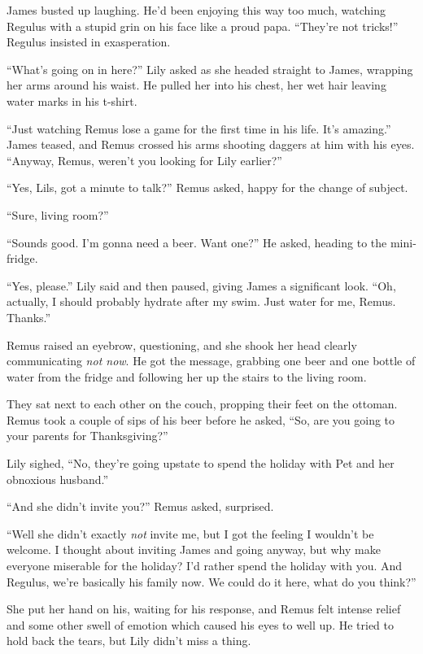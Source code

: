 \documentclass[12pt,twoside,openright]{memoir}
\begin{document}
James busted up laughing. He'd been enjoying this way too much, watching Regulus with a stupid grin on his face like a proud papa. ``They're not tricks!'' Regulus insisted in exasperation. 

``What's going on in here?'' Lily asked as she headed straight to James, wrapping her arms around his waist. He pulled her into his chest, her wet hair leaving water marks in his t-shirt. 

``Just watching Remus lose a game for the first time in his life. It's amazing.'' James teased, and Remus crossed his arms shooting daggers at him with his eyes. ``Anyway, Remus, weren't you looking for Lily earlier?'' 

``Yes, Lils, got a minute to talk?'' Remus asked, happy for the change of subject.

``Sure, living room?'' 

``Sounds good. I'm gonna need a beer. Want one?'' He asked, heading to the mini-fridge.

``Yes, please.'' Lily said and then paused, giving James a significant look. ``Oh, actually, I should probably hydrate after my swim. Just water for me, Remus. Thanks.''

Remus raised an eyebrow, questioning, and she shook her head clearly communicating \textit{not now}. He got the message, grabbing one beer and one bottle of water from the fridge and following her up the stairs to the living room.

They sat next to each other on the couch, propping their feet on the ottoman. Remus took a couple of sips of his beer before he asked, ``So, are you going to your parents for Thanksgiving?'' 

Lily sighed, ``No, they're going upstate to spend the holiday with Pet and her obnoxious husband.''

``And she didn't invite you?'' Remus asked, surprised. 

``Well she didn't exactly \textit{not} invite me, but I got the feeling I wouldn't be welcome. I thought about inviting James and going anyway, but why make everyone miserable for the holiday? I'd rather spend the holiday with you. And Regulus, we're basically his family now. We could do it here, what do you think?''

She put her hand on his, waiting for his response, and Remus felt intense relief and some other swell of emotion which caused his eyes to well up. He tried to hold back the tears, but Lily didn't miss a thing. 
\end{document}
